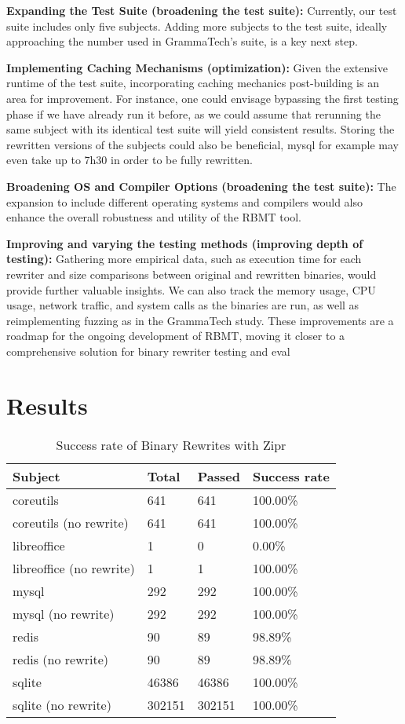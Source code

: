 \documentclass[a4paper,11pt,oneside]{report}
\begin{document}
\textbf{Expanding the Test Suite (broadening the test suite):} Currently, our test suite
includes only five subjects. Adding more subjects to the test suite, ideally approaching the
number used in GrammaTech's suite, is a key next step.

\textbf{Implementing Caching Mechanisms (optimization):} Given the extensive runtime of
the test suite, incorporating caching mechanics post-building is an area for improvement.
For instance, one could envisage bypassing the first testing phase if we have already run it
before, as we could assume that rerunning the same subject with its identical test suite will
yield consistent results. Storing the rewritten versions of the subjects could also be
beneficial, mysql for example may even take up to 7h30 in order to be fully rewritten.

\textbf{Broadening OS and Compiler Options (broadening the test suite):} The expansion
to include different operating systems and compilers would also enhance the overall
robustness and utility of the RBMT tool.

\textbf{Improving and varying the testing methods (improving depth of testing):}
Gathering more empirical data, such as execution time for each rewriter and size
comparisons between original and rewritten binaries, would provide further valuable
insights. We can also track the memory usage, CPU usage, network traffic, and system calls
as the binaries are run, as well as reimplementing fuzzing as in the GrammaTech study.
These improvements are a roadmap for the ongoing development of RBMT, moving
it closer to a comprehensive solution for binary rewriter testing and eval

\chapter{Results}

\begin{table}[h]
    \centering
    \caption{Success rate of Binary Rewrites with Zipr}
    \begin{tabular}{|l|l|l|l|}
    \hline
    Subject & Total & Passed & Success rate \\ \hline
    coreutils & 641 & 641 & 100.00\% \\ \hline
    coreutils (no rewrite) & 641 & 641 & 100.00\% \\ \hline
    libreoffice & 1 & 0 & 0.00\% \\ \hline
    libreoffice (no rewrite) & 1 & 1 & 100.00\% \\ \hline
    mysql & 292 & 292 & 100.00\% \\ \hline
    mysql (no rewrite) & 292 & 292 & 100.00\% \\ \hline
    redis & 90 & 89 & 98.89\% \\ \hline
    redis (no rewrite) & 90 & 89 & 98.89\% \\ \hline
    sqlite & 46386 & 46386 & 100.00\% \\ \hline
    sqlite (no rewrite) & 302151 & 302151 & 100.00\% \\ \hline
    \end{tabular}
    \end{table}
    
\end{document}
